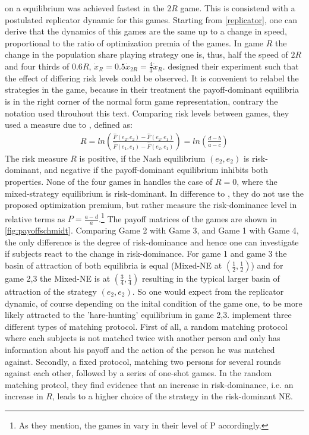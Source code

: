 \documentclass[11pt]{article}
\begin{document}
on a equilibrium was achieved fastest in the $2R$ game. 
This is consistend with a postulated replicator dynamic for this games. 
Starting from \ref{replicator}, one can derive that the dynamics of this games
are the same up to a change in speed, proportional to the ratio of 
optimization premia of the games. In game $R$ the change in the population share
playing strategy one is, thus, half the speed of $2R$ and four thirds of $0.6R$,
$\dot{x}_{R} = 0.5 \dot{x}_{2R} = \frac{4}{3}\dot{x}_R$.
\textcite{schmidt_playing_2003} designed their experiment such that the effect
of differing risk levels could be observed. It is convenient to relabel 
the strategies in the game, because in their treatment the payoff-dominant 
equilibria is in the right corner of the normal form game representation,
contrary the notation used throuhout this text. Comparing risk levels between
games, they used a measure due to \cite{Seltenanaxiomaticriskmeasure}, defined
as:
\begin{align}
        \label{riskmeasureschmidt}
        R = ln\left(\frac{\hat{F}(e_2,e_2) -\hat{F}(e_2,e_1)}{\hat{F}(e_1,e_1) 
        -\hat{F}(e_2,e_1)}\right) = ln \left(\frac{d-b}{a-c}\right)
\end{align}
The risk measure $R$ is positive, if the Nash equilibrium $(e_2,e_2)$ is
risk-dominant, and negative if the payoff-dominant equilibrium inhibits both
properties.
None of the four games in \textcite{schmidt_playing_2003} handles
the case of $R=0$, where the mixed-strategy equilibrium is risk-dominant.
In difference to \textcite{battalio_optimization_2001}, they do not
use the proposed optimization premium, but rather measure the risk-dominance 
level in relative terms as $P=\frac{a-d}{a}$.\footnote{As they mention, the 
games in \textcite{battalio_optimization_2001} vary in their level of 
P accordingly.}
The payoff matrices of the games are shown in \ref{fig:payoffschmidt}.
Comparing Game 2 with Game 3, and Game 1 with Game 4, the only difference is the 
degree of risk-dominance and hence one can investigate if subjects react 
to the change in risk-dominance. For game 1 and game 3 the basin of attraction
of both equilibria is equal (Mixed-NE at $(\frac 12, \frac 12)$) and  for
game 2,3 the Mixed-NE is at $(\frac 34,\frac 14)$ resulting in the typical 
larger basin of attraction of the strategy $(e_2,e_2)$. So one would expect
from the replicator dynamic, of course depending on the inital condition 
of the game one, to be more likely attracted to the 'hare-hunting' equilibrium
in game 2,3.
\textcite{schmidt_playing_2003} implement three different types of matching
protocol. First of all, a random matching protocol where each subjects is not
matched twice with another person and only has information about his payoff and
the action of the person he was matched against. 
Secondly, a fixed protocol, matching two persons for several rounds against 
each other, followed by a series of one-shot games. 
In the random matching protcol, they find evidence that an increase in 
risk-dominance, i.e. an increase in $R$, leads to a higher choice of the
strategy in the risk-dominant NE. 
\end{document}
